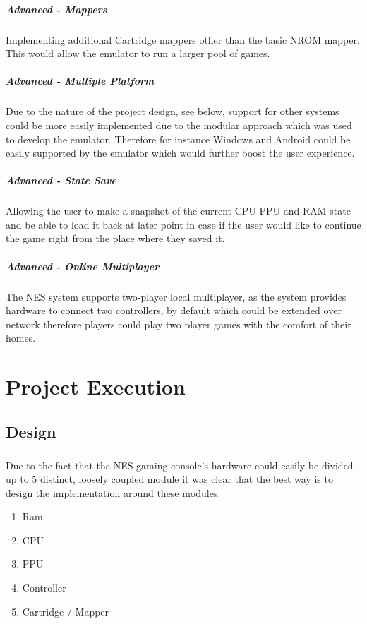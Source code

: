 \documentclass[]{report}
\begin{document}
\paragraph{Advanced - Mappers}
Implementing additional Cartridge mappers other than the basic NROM mapper\cite{MPPR}. This would allow the emulator to run a larger pool of games.

\paragraph{Advanced - Multiple Platform}
Due to the nature of the project design, see below, support for other systems could be more easily implemented due to the modular approach which was used to develop the emulator. Therefore for instance Windows and Android could be easily supported by the emulator which would further boost the user experience.

\paragraph{Advanced - State Save}
Allowing the user to make a snapshot of the current CPU PPU and RAM state and be able to load it back at later point in case if the user would like to continue the game right from the place where they saved it.

\paragraph{Advanced - Online Multiplayer}
The NES system supports two-player local multiplayer, as the system provides hardware to connect two controllers, by default which could be extended over network therefore players could play two player games with the comfort of their homes.

\chapter{Project Execution}

\section{Design}

\paragraph{ }
Due to the fact that the NES gaming console's hardware could easily be divided up to 5 distinct, loosely coupled module it was clear that the best way is to design the implementation around these modules:
\begin{enumerate}
	\item Ram
	\item CPU
	\item PPU
	\item Controller
	\item Cartridge / Mapper
\end{enumerate}
\end{document}
